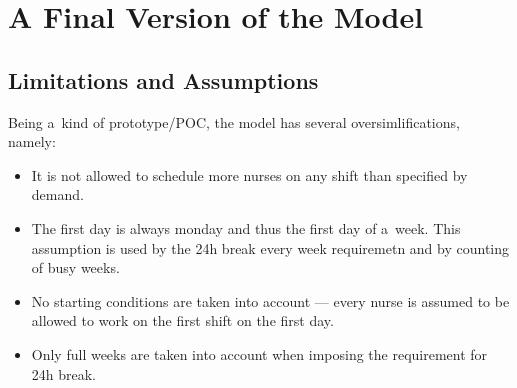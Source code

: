 \section{A Final Version of the Model}


\subsection{Limitations and Assumptions}

Being a~kind of prototype/POC, the model has several oversimlifications, namely:

\begin{itemize}
    \item It is not allowed to schedule more nurses on any shift than specified by demand.
    \item The first day is always monday and thus the first day of a~week. This assumption is used by the 24h break every week requiremetn and by counting of busy weeks.
    \item No starting conditions are taken into account --- every nurse is assumed to be allowed to work on the first shift on the first day.
    \item Only full weeks are taken into account when imposing the requirement for 24h break.
\end{itemize}


